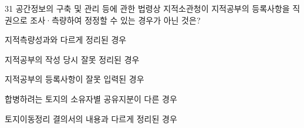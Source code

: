 \begin{question}{31}
공간정보의 구축 및 관리 등에 관한 법령상 지적소관청이 지적공부의 등록사항을 직권으로 조사·측량하여 정정할 수 있는 경우가 아닌 것은?
\begin{choices}
  \item 지적측량성과와 다르게 정리된 경우
  \item 지적공부의 작성 당시 잘못 정리된 경우
  \item 지적공부의 등록사항이 잘못 입력된 경우
  \item 합병하려는 토지의 소유자별 공유지분이 다른 경우
  \item 토지이동정리 결의서의 내용과 다르게 정리된 경우
\end{choices}
\end{question}
